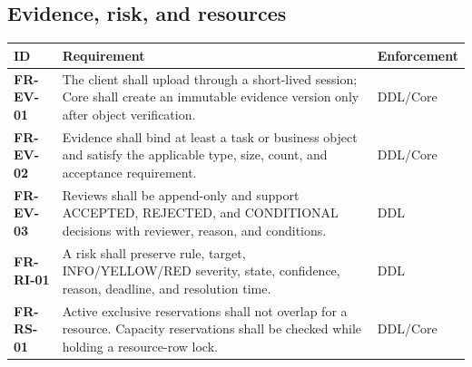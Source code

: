 \documentclass[journal,a4paper,onecolumn]{IEEEtran}
\newcommand{\req}[1]{\textbf{#1}}
\begin{document}
\subsection{Evidence, risk, and resources}
\begin{longtable}{p{}p{}p{}}
\toprule
ID & Requirement & Enforcement \\
\midrule
\endhead
\req{FR-EV-01} & The client shall upload through a short-lived session; Core shall create an immutable evidence version only after object verification. & DDL/Core\\
\req{FR-EV-02} & Evidence shall bind at least a task or business object and satisfy the applicable type, size, count, and acceptance requirement. & DDL/Core\\
\req{FR-EV-03} & Reviews shall be append-only and support ACCEPTED, REJECTED, and CONDITIONAL decisions with reviewer, reason, and conditions. & DDL\\
\req{FR-RI-01} & A risk shall preserve rule, target, INFO/YELLOW/RED severity, state, confidence, reason, deadline, and resolution time. & DDL\\
\req{FR-RS-01} & Active exclusive reservations shall not overlap for a resource. Capacity reservations shall be checked while holding a resource-row lock. & DDL/Core\\
\bottomrule
\end{longtable}
\end{document}
